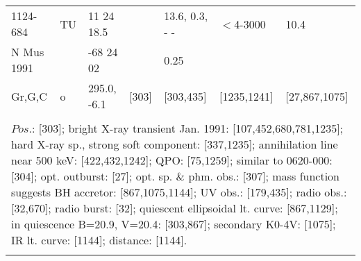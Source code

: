 \documentclass{aa}
\begin{document}
\begin{tabular}{p{2.5cm}p{1cm}p{1.8cm}p{2.3cm}p{3.3cm}p{2.0cm}p{2.2cm}}
\noalign{\smallskip}
1124-684            & TU         & 11 24 18.5       &                  & 13.6, 0.3, - -          & $<$4-3000       & 10.4                  \\
N Mus 1991       &               & -68 24 02         &                   & 0.25                       &                           &                           \\
Gr,G,C                & o            & 295.0, -6.1       & [303]        & [303,435]              & [1235,1241]     & [27,867,1075]   \\
\\
\multicolumn{7}{p{17.5cm}}{
$Pos$.: [303]; bright X-ray transient Jan. 1991: [107,452,680,781,1235]; hard X-ray sp., strong soft component: 
[337,1235]; annihilation line near 500 keV: [422,432,1242]; QPO: [75,1259]; similar to 0620-000: [304]; 
opt. outburst: [27]; opt. sp. \& phm. obs.: [307]; mass function suggests BH accretor: [867,1075,1144]; 
UV obs.: [179,435]; radio obs.: [32,670]; radio burst: [32]; quiescent ellipsoidal lt. curve: [867,1129]; in 
quiescence B=20.9, V=20.4: [303,867]; secondary K0-4V: [1075]; IR lt. curve: [1144]; distance: [1144].}\\
\noalign{\smallskip}
\hline

\end{tabular}
\end{document}
